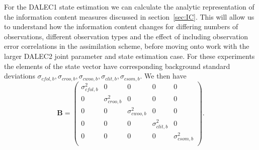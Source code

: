 \documentclass[11pt]{article}
\begin{document}
For the DALEC1 state estimation we can calculate the analytic representation of the information content measures discussed in section~\ref{sec:IC}. This will allow us to understand how the information content changes for differing numbers of observations, different observation types and the effect of including observation error correlations in the assimilation scheme, before moving onto work with the larger DALEC2 joint parameter and state estimation case. For these experiments the elements of the state vector have corresponding background standard deviations $ \sigma_{cfol, b}, \sigma_{croo, b}, \sigma_{cwoo, b}, \sigma_{clit, b}, \sigma_{csom, b}$. We then have
\begin{equation}
\textbf{B} = \begin{pmatrix} 
\sigma_{cfol,b}^{2} & 0 & 0 & 0 & 0 \\
0 & \sigma_{croo,b}^{2} & 0 & 0 & 0 \\
0 & 0 & \sigma_{cwoo,b}^{2} & 0 & 0 \\
0 & 0 & 0 & \sigma_{clit,b}^{2} & 0 \\
0 & 0 & 0 & 0 & \sigma_{csom,b}^{2} \\
\end{pmatrix}. \label{eqn:BmatD1}
\end{equation}   
\end{document}
